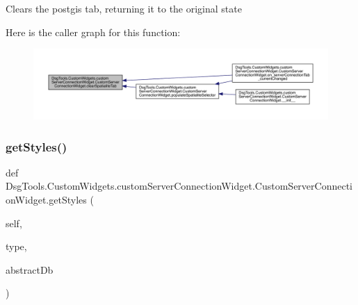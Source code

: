 \begin{DoxyVerb}Clears the postgis tab, returning it to the original state
\end{DoxyVerb}
 Here is the caller graph for this function\+:
\nopagebreak
\begin{figure}[H]
\begin{center}
\leavevmode
\includegraphics[width=350pt]{class_dsg_tools_1_1_custom_widgets_1_1custom_server_connection_widget_1_1_custom_server_connection_widget_a9692467a0f69f7a6337ca6eaa64f6913_icgraph}
\end{center}
\end{figure}
\mbox{\label{class_dsg_tools_1_1_custom_widgets_1_1custom_server_connection_widget_1_1_custom_server_connection_widget_ab1d6b7c046e369541cd3899f4899c73d}} 
\subsubsection{\texorpdfstring{get\+Styles()}{getStyles()}}
{\footnotesize\ttfamily def Dsg\+Tools.\+Custom\+Widgets.\+custom\+Server\+Connection\+Widget.\+Custom\+Server\+Connection\+Widget.\+get\+Styles (\begin{DoxyParamCaption}\item[{}]{self,  }\item[{}]{type,  }\item[{}]{abstract\+Db }\end{DoxyParamCaption})}

